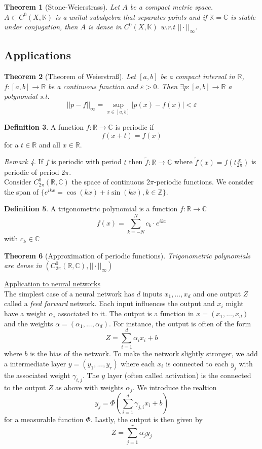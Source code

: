 \documentclass[a4paper, 12pt]{article}
\theoremstyle{plain}
\newtheorem{theorem}{Theorem}[subsection] %
\theoremstyle{definition}
\newtheorem{definition}[theorem]{Definition} %
\theoremstyle{lemma}
\theoremstyle{remark}
\newtheorem{remark}[theorem]{Remark}
\theoremstyle{corollary}
\theoremstyle{example}
\begin{document}
	\begin{theorem}[Stone-Weierstrass]
		Let $A$ be a compact metric space. $A \subset C^0(X,\mathbb{K})$ is a unital subalgebra that separates points and if $\mathbb{K} = \mathbb{C}$ is stable under conjugation, then $A$ is dense in $C^0(X,\mathbb{K})$ w.r.t $||\cdot||_\infty$.
	\end{theorem}
	\subsection{Applications}
	\begin{theorem}[Theorem of Weierstraß]
		Let $[a,b]$ be a compact interval in $\mathbb{R}$, $f:[a,b] \to \mathbb{R}$ be a continuous function and $\varepsilon>0$. Then $\exists p: [a,b] \to \mathbb{R}$ a polynomial s.t. \[||p-f||_\infty = \sup_{x \in [a,b]} \left|p(x)-f(x)\right| < \varepsilon\]
	\end{theorem}
	\begin{definition}
		A function $f:\mathbb{R} \to \mathbb{C}$ is periodic if \[f(x+t) = f(x)\] for a $t \in \mathbb{R}$ and all $x \in \mathbb{R}$.
	\end{definition}
	\begin{remark}
		If $f$ is periodic with period $t$ then $\tilde{f}: \mathbb{R} \to \mathbb{C}$ where $\tilde{f}(x) = f(t\frac{x}{2\pi})$ is periodic of period $2\pi$.\\
		Consider $C_{2\pi}^0(\mathbb{R}, \mathbb{C})$ the space of continuous $2\pi$-periodic functions. We consider the span of $\{e^{ikx} = \cos(kx)+i\sin(kx),k \in \mathbb{Z}\}$.
	\end{remark}
	\begin{definition}
		A trigonometric polynomial is a function $f:\mathbb{R} \to \mathbb{C}$ \[f(x) = \sum_{k=-N}^{N} c_k\cdot e^{ikx}\] with $c_k \in \mathbb{C}$
	\end{definition}
	\begin{theorem}[Approximation of periodic functions]
		Trigonometric polynomials are dense in $(C_{2\pi}^0(\mathbb{R},\mathbb{C}),||\cdot||_\infty)$ 
	\end{theorem}
	\underline{Application to neural networks}\\
	The simplest case of a neural network has $d$ inputs $x_1,...,x_d$ and one output $Z$ called a \textit{feed forward} network. Each input influences the output and $x_i$ might have a weight $\alpha_i$ associated to it. The output is a function in $x=(x_1,...,x_d)$ and the weights $\alpha= (\alpha_1,...,\alpha_d)$. For instance, the output is often of the form \[Z = \sum_{i=1}^d \alpha_ix_i + b\] where $b$ is the bias of the network. To make the network slightly stronger, we add a intermediate layer $y = (y_1,...,y_r)$ where each $x_i$ is connected to each $y_j$ with the associated weight $\gamma_{i,j}$. The $y$ layer (often called activation) is the connected to the output $Z$ as above with weights $\alpha_j$. We introduce the realtion \[y_j = \Phi(\sum_{i=1}^d \gamma_{j,i}x_i+b)\] for a measurable function $\Phi$. Lastly, the output is then given by \[Z = \sum_{j=1}^r \alpha_j y_j\]
\end{document}
